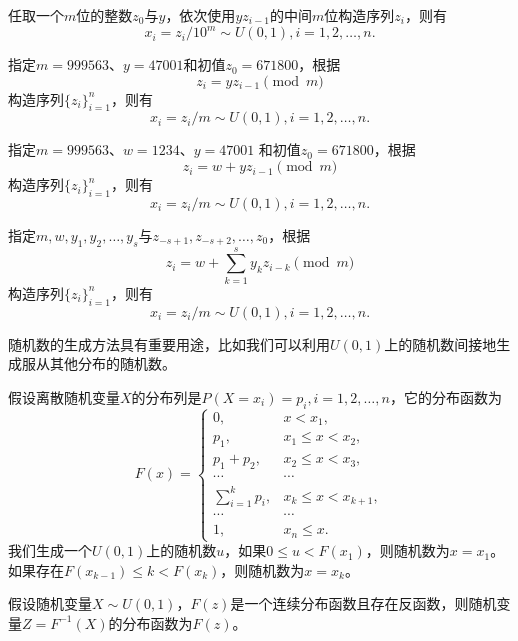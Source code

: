\begin{proposition}[倍积取中法]
任取一个$m$位的整数$z_0$与$y$，依次使用$yz_{i-1}$的中间$m$位构造序列$z_i$，则有\[x_i=z_i/10^m\sim U(0,1), i = 1, 2,\ldots,n.\]
\end{proposition}

\begin{proposition}[一阶线性同余法]%
指定$m=999563$、$y=47001$和初值$z_0=671800$，根据\[z_i=yz_{i-1} \pmod{m}\] 构造序列$\{z_i\}_{i=1}^n$，则有\[x_i=z_i/m\sim U(0,1), i = 1, 2,\ldots,n.\]
\end{proposition}

\begin{proposition}[一阶混合同余法]
指定$m=999563$、$w=1234$、$y=47001$ 和初值$z_0=671800$，根据\[z_i=w + yz_{i-1} \pmod{m}\] 构造序列$\{z_i\}_{i=1}^n$，则有\[x_i=z_i/m\sim U(0,1), i = 1, 2,\ldots,n.\]
\end{proposition}

\begin{proposition}[S阶混合同余法]
指定$m, w, y_1, y_2, \ldots, y_s$与$z_{-s+1}, z_{-s+2}, \ldots, z_0$，根据\[z_i=w + \sum\limits_{k=1}^s y_k z_{i-k} \pmod{m}\]构造序列$\{z_i\}_{i=1}^n$，则有\[x_i=z_i/m\sim U(0,1), i = 1, 2,\ldots,n.\]
\end{proposition}

随机数的生成方法具有重要用途，比如我们可以利用$U(0,1)$上的随机数间接地生成服从其他分布的随机数。

假设离散随机变量$X$的分布列是$P(X=x_i)=p_i, i=1,2,\ldots,n$，它的分布函数为
\begin{equation}
    F(x) = \left\{
    \begin{array}{rl}
    0, & x<x_1,\\
    p_1, & x_1\le x<x_2,\\
    p_1 + p_2, & x_2\le x<x_3,\\
    \cdots & \cdots\\
    \sum\limits_{i=1}^k p_i, & x_k \le x < x_{k+1}, \\
    \cdots & \cdots\\
    1, & x_n \le x.
    \end{array}
    \right.
\end{equation}
我们生成一个$U(0,1)$上的随机数$u$，如果$0\le u < F(x_1)$，则随机数为$x=x_1$。如果存在$F(x_{k-1})\le k < F(x_k)$，则随机数为$x=x_k$。

\begin{theorem}[反函数法]
假设随机变量$X\sim U(0,1)$，$F(z)$是一个连续分布函数且存在反函数，则随机变量$Z=F^{-1}(X)$的分布函数为$F(z)$。
\end{theorem}

